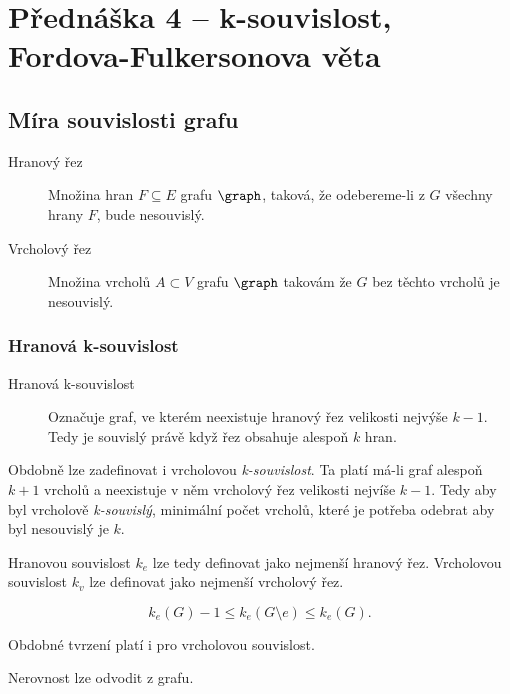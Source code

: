 \section{Přednáška 4 -- k-souvislost, Fordova-Fulkersonova věta}

\subsection{Míra souvislosti grafu}

\begin{description}
    \item[Hranový řez] Množina hran $F \subseteq E$ grafu $\graph$, taková, že odebereme-li z $G$ všechny hrany $F$, bude nesouvislý.
    \item[Vrcholový řez] Množina vrcholů $A \subset V$ grafu $\graph$ takovám že $G$ bez těchto vrcholů je nesouvislý.
\end{description}

\subsubsection{Hranová k-souvislost}

\begin{description}
    \item[Hranová k-souvislost] Označuje graf, ve kterém neexistuje hranový řez velikosti nejvýše $k-1$.
    Tedy je souvislý právě když řez obsahuje alespoň $k$ hran.
\end{description}

Obdobně lze zadefinovat i vrcholovou \textit{k-souvislost}.
Ta platí má-li graf alespoň $k+1$ vrcholů a neexistuje v něm vrcholový řez velikosti nejvíše $k-1$.
Tedy aby byl vrcholově \textit{k-souvislý}, minimální počet vrcholů, které je potřeba odebrat aby byl nesouvislý je $k$.

\medskip

Hranovou souvislost $k_e$ lze tedy definovat jako nejmenší hranový řez.
Vrcholovou souvislost $k_v$ lze definovat jako nejmenší vrcholový řez.


\[
    k_e(G) - 1 \leq k_e(G \setminus e) \leq k_e(G) \text{.}
\]

Obdobné tvrzení platí i pro vrcholovou souvislost.

\label{lemma:vztah-souvislosti}

Nerovnost lze odvodit z  grafu.

